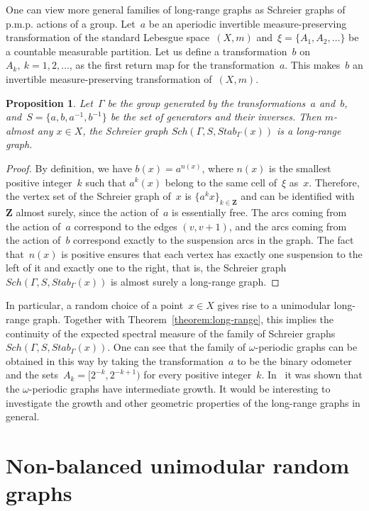 \documentclass[english]{article}
\newtheorem{proposition}[lemma]{Proposition}
\theoremstyle{definition}
\newcommand*{\field}[1]{\mathbf{#1}} %
\newcommand*\Z{\field{Z}} %
\begin{document}
One can view more general families of long-range graphs as Schreier graphs of p.m.p. actions of a group. Let~$a$ be an aperiodic invertible measure-preserving transformation of the standard Lebesgue space~$(X,m)$  and~$\xi = \{A_1, A_2,\ldots \}$ be a countable measurable partition. Let us define a transformation~$b$ on~$A_k, \ k =1, 2,\ldots$, as the first return map for the transformation~$a$. This makes~$b$ an invertible measure-preserving transformation of~$(X, m)$. 
\begin{proposition}
    Let~$\Gamma$ be the group generated by the transformations~$a$ and~$b$, and~$S = \{a, b, a^{-1}, b^{-1}\}$ be the set of generators and their inverses. Then $m$-almost any $x \in X$, the Schreier graph $Sch(\Gamma, S,   Stab_\Gamma(x))$ is a long-range graph.
\end{proposition}
\begin{proof}
    By definition, we have $b(x) = a^{n(x)}$, where $n(x)$ is the smallest positive integer~$k$ such that $a^k(x)$ belong to the same cell of~$\xi$ as~$x$. Therefore, the vertex set of the Schreier graph of~$x$ is $\{a^kx\}_{k\in\Z}$ and can be identified with~$\Z$ almost surely, since the action of~$a$ is essentially free. The arcs coming from the action of~$a$ correspond to the edges $(v, v+1)$, and the arcs coming from the action of~$b$ correspond exactly to the suspension arcs in the graph. The fact that~$n(x)$ is positive ensures that each vertex has exactly one suspension to the left of it and exactly one to the right, that is, the Schreier graph $Sch(\Gamma, S,   Stab_\Gamma(x))$ is almost surely a long-range graph. 
\end{proof}

In particular, a random choice of a point~$x \in X$ gives rise to a unimodular long-range graph. Together with Theorem~\ref{theorem:long-range}, this implies the continuity of the expected spectral measure of the family of Schreier graphs~$Sch(\Gamma, S,   Stab_\Gamma(x))$. One can see that the family of $\omega$-periodic graphs can be obtained in this way by taking the transformation~$a$ to be the binary odometer and the sets~$A_k = [2^{-k}, 2^{-k + 1})$ for every positive integer~$k$. In~\cite{BH, BCDN} it was shown that the $\omega$-periodic graphs have intermediate growth. It would be interesting to investigate the growth and other geometric properties of the long-range graphs in general. 


\section{Non-balanced unimodular random graphs}
\end{document}
